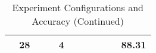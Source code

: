 \begin{landscape}
\begin{table}
\begin{tabular}{c|c|c|c|c|c|c|c|c|c|c}
                                                                                            & 28                  &                                                     &                            & 4                        &                         &                                &                    &                    &                        & 88.31 \\ \hline
\end{tabular}

\caption{Experiment Configurations and Accuracy (Continued)}
\end{table}

\end{landscape}